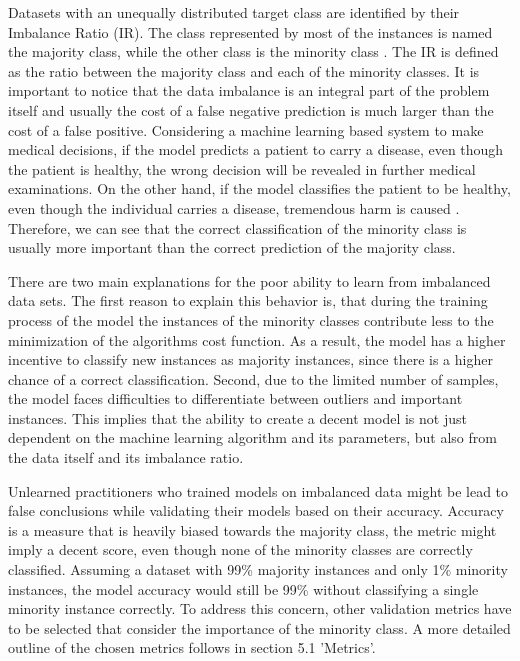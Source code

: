\documentclass[parskip=full]{scrartcl}
\begin{document}
Datasets with an unequally distributed target class are identified by their
Imbalance Ratio (IR). The class represented by most of the instances is named
the majority class, while the other class is the minority class
\cite{Chawla2003}. The IR is defined as the ratio between the majority class and
each of the minority classes. It is important to notice that the data imbalance
is an integral part of the problem itself and usually the cost of a false
negative prediction is much larger than the cost of a false positive.
Considering a machine learning based system to make medical decisions, if the
model predicts a patient to carry a disease, even though the patient is healthy,
the wrong decision will be revealed in further medical examinations. On the
other hand, if the model classifies the patient to be healthy, even though the
individual carries a disease, tremendous harm is caused
\cite{Wan2014LearningTI}. Therefore, we can see that the correct classification
of the minority class is usually more important than the correct prediction of
the majority class.

There are two main explanations for the poor ability to learn from imbalanced
data sets. The first reason to explain this behavior is, that during the
training process of the model the instances of the minority classes contribute
less to the minimization of the algorithms cost function. As a result, the model
has a higher incentive to classify new instances as majority instances, since
there is a higher chance of a correct classification. Second, due to the limited
number of samples, the model faces difficulties to differentiate between
outliers and important instances. This implies that the ability to create a
decent model is not just dependent on the machine learning algorithm and its
parameters, but also from the data itself and its imbalance ratio.

Unlearned practitioners who trained models on imbalanced data might be lead to
false conclusions while validating their models based on their accuracy.
Accuracy is a measure that is heavily biased towards the majority class, the
metric might imply a decent score, even though none of the minority classes are
correctly classified. Assuming a dataset with 99\% majority instances and only
1\% minority instances, the model accuracy would still be 99\% without
classifying a single minority instance correctly. To address this concern, other
validation metrics have to be selected that consider the importance of the
minority class. A more detailed outline of the chosen metrics follows in section
5.1 'Metrics'.
\end{document}
